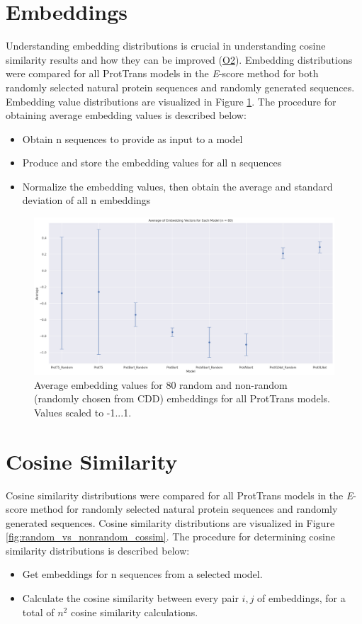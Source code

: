 \section{Embeddings}
Understanding embedding distributions is crucial in understanding cosine similarity results and how they can be improved (\hyperlink{O2}{O2}). Embedding distributions were compared for all ProtTrans models in the \textit{E}-score method for both randomly selected natural protein sequences and randomly generated sequences. Embedding value distributions are visualized in Figure \ref{fig:embedding_avg}.     The procedure for obtaining average embedding values is described below:
\begin{itemize}
    \item{Obtain n sequences to provide as input to a model}
    \item{Produce and store the embedding values for all n sequences}
    \item{Normalize the embedding values, then obtain the average and standard deviation of all n embeddings}
\end{itemize}

\begin{figure}[H]
    \begin{center}
	   \includegraphics[width=0.9\linewidth]{figures/embedding_avg.png}
    \end{center}
    \caption{Average embedding values for 80 random and non-random (randomly chosen from CDD) embeddings for all ProtTrans models. Values scaled to -1...1.}
    \label{fig:embedding_avg}
\end{figure}

\section{Cosine Similarity}
Cosine similarity distributions were compared for all ProtTrans models in the \textit{E}-score method for randomly selected natural protein sequences and randomly generated sequences. Cosine similarity distributions are visualized in Figure \ref{fig:random_vs_nonrandom_cossim}. The procedure for determining cosine similarity distributions is described below:
\begin{itemize}
    \item{Get embeddings for n sequences from a selected model.}
    \item{Calculate the cosine similarity between every pair \(i, j\) of embeddings, for a total of \(n^2\) cosine similarity calculations.}
\end{itemize}


